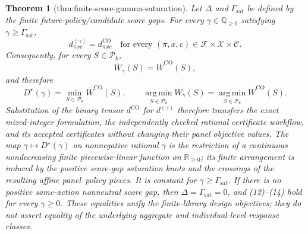 \documentclass{article}
\newtheorem{theorem}{Theorem}
\begin{document}
\begin{theorem}[thm:finite-score-gamma-saturation]\label{thm:finite-score-gamma-saturation}
Let \(\Delta\) and \(\Gamma_{\mathrm{sat}}\) be defined by the finite
future-policy/candidate score gaps.  For every
\(\gamma\in\mathbb Q_{\geq0}\) satisfying
\(\gamma\geq\Gamma_{\mathrm{sat}}\),
\[
d^{(\gamma)}_{\pi xc}=d^{\mathrm{CO}}_{\pi xc}
\quad\text{for every }(\pi,x,c)\in
\mathcal F\times\mathcal X\times\mathcal C.                       \tag{12}
\]
Consequently, for every \(S\in\mathcal P_k\),
\[
\overline W_\gamma(S)=\overline W^{\mathrm{CO}}(S),                \tag{13}
\]
and therefore
\[
D^\star(\gamma)=\min_{S\in\mathcal P_k}\overline W^{\mathrm{CO}}(S),
\qquad
\operatorname*{arg\,min}_{S\in\mathcal P_k}\overline W_\gamma(S)
=\operatorname*{arg\,min}_{S\in\mathcal P_k}
\overline W^{\mathrm{CO}}(S).                                      \tag{14}
\]
Substitution of the binary tensor \(d^{\mathrm{CO}}\) for
\(d^{(\gamma)}\) therefore transfers the exact mixed-integer formulation,
the independently checked rational certificate workflow, and its accepted
certificates without changing their panel objective values.  The map
\(\gamma\mapsto D^\star(\gamma)\) on nonnegative rational \(\gamma\) is
the restriction of a continuous nondecreasing finite piecewise-linear
function on \(\mathbb R_{\geq0}\); its finite arrangement is induced by
the positive score-gap saturation knots and the crossings of the resulting
affine panel--policy pieces.  It is constant for
\(\gamma\geq\Gamma_{\mathrm{sat}}\).  If there is no positive same-action
nonneutral score gap, then \(\Delta=\Gamma_{\mathrm{sat}}=0\), and
(12)--(14) hold for every \(\gamma\geq0\).  These equalities unify the
finite-library design objectives; they do not assert equality of the
underlying aggregate and individual-level response classes.
\end{theorem}
\end{document}
